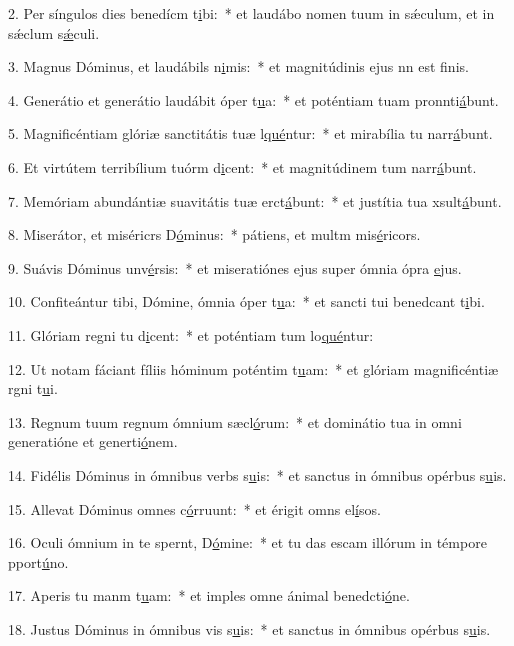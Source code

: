 2. Per síngulos dies benedícm t\uline{i}bi:~* et laudábo nomen tuum in sǽculum, et in sǽclum s\uline{ǽ}culi.\par 
3. Magnus Dóminus, et laudábils n\uline{i}mis:~* et magnitúdinis ejus nn est f\uline{i}nis.\par 
4. Generátio et generátio laudábit óper t\uline{u}a:~* et poténtiam tuam pronnti\uline{á}bunt.\par 
5. Magnificéntiam glóriæ sanctitátis tuæ l\uline{qué}ntur:~* et mirabília tu narr\uline{á}bunt.\par 
6. Et virtútem terribílium tuórm d\uline{i}cent:~* et magnitúdinem tum narr\uline{á}bunt.\par 
7. Memóriam abundántiæ suavitátis tuæ erct\uline{á}bunt:~* et justítia tua xsult\uline{á}bunt.\par 
8. Miserátor, et miséricrs D\uline{ó}minus:~* pátiens, et multm mis\uline{é}ricors.\par 
9. Suávis Dóminus unv\uline{é}rsis:~* et miseratiónes ejus super ómnia ópra \uline{e}jus.\par 
10. Confiteántur tibi, Dómine, ómnia óper t\uline{u}a:~* et sancti tui benedcant t\uline{i}bi.\par 
11. Glóriam regni tu d\uline{i}cent:~* et poténtiam tum lo\uline{qué}ntur:\par 
12. Ut notam fáciant fíliis hóminum poténtim t\uline{u}am:~* et glóriam magnificéntiæ rgni t\uline{u}i.\par 
13. Regnum tuum regnum ómnium sæcl\uline{ó}rum:~* et dominátio tua in omni generatióne et generti\uline{ó}nem.\par 
14. Fidélis Dóminus in ómnibus verbs s\uline{u}is:~* et sanctus in ómnibus opérbus s\uline{u}is.\par 
15. Allevat Dóminus omnes  c\uline{ó}rruunt:~* et érigit omns el\uline{í}sos.\par 
16. Oculi ómnium in te spernt, D\uline{ó}mine:~* et tu das escam illórum in témpore pport\uline{ú}no.\par 
17. Aperis tu manm t\uline{u}am:~* et imples omne ánimal benedcti\uline{ó}ne.\par 
18. Justus Dóminus in ómnibus vis s\uline{u}is:~* et sanctus in ómnibus opérbus s\uline{u}is.\par 

